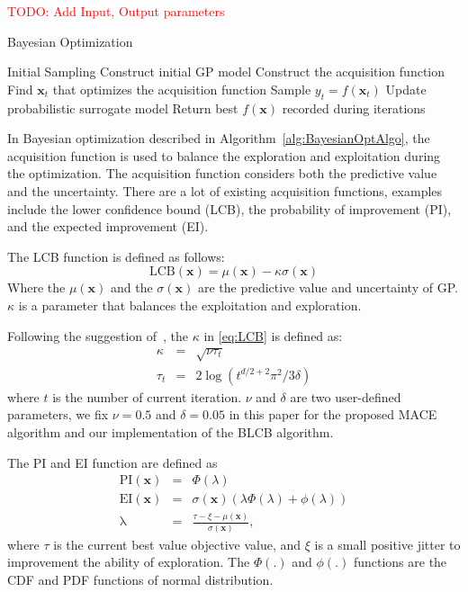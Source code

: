 \textcolor{red}{TODO: Add Input, Output parameters}
\begin{algorithm}
\caption{Bayesian Optimization}
\label{alg:BayesianOptAlgo}
\begin{algorithmic}[1]
\STATE Initial Sampling
\STATE Construct initial GP model
\STATE Construct the acquisition function
\STATE Find $\bm{x}_t$ that optimizes the acquisition function
\STATE Sample $y_t = f(\bm{x}_t)$
\STATE Update probabilistic surrogate model
\ENDFOR
\STATE Return best $f(\bm{x})$ recorded during iterations
\end{algorithmic}
\end{algorithm}

In Bayesian optimization described in Algorithm~\ref{alg:BayesianOptAlgo}, the acquisition function is used to balance the exploration and exploitation during the optimization. The acquisition function considers both the predictive value and the uncertainty. There are a lot of existing acquisition functions, examples include the lower confidence bound (LCB), the probability of improvement (PI), and the expected improvement (EI).

The LCB function is defined as follows:
\begin{equation}
    \label{eq:LCB}
    \mathrm{LCB}(\bm{x}) = \mu(\bm{x}) - \kappa \sigma(\bm{x})
\end{equation}
Where the $\mu(\bm{x})$ and the $\sigma(\bm{x})$ are the predictive value and uncertainty of GP. $\kappa$ is a parameter that balances the exploitation and exploration. 

Following the suggestion of~\cite{brochu2010tutorial}, the $\kappa$ in \eqref{eq:LCB} is defined as:
\begin{equation}
    \label{eq:LCBKappa}
    \begin{array}{lll}
        \kappa &=& \sqrt{\nu \tau_t} \\
        \tau_t &=& 2 \log(t^{d/2+2} \pi^2 / 3 \delta)
    \end{array}
\end{equation}
where $t$ is the number of current iteration. $\nu$ and $\delta$ are two user-defined parameters, we fix $\nu = 0.5$ and $\delta = 0.05$ in this paper for the proposed MACE algorithm and our implementation of the BLCB algorithm.

The PI and EI function are defined as
\begin{equation}
    \label{eq:PI_EI}
    \begin{array}{lll}
        \mathrm{PI}(\bm{x}) &=& \Phi(\lambda) \\
        \mathrm{EI}(\bm{x}) &=& \sigma(\bm{x}) (\lambda \Phi(\lambda) + \phi(\lambda))     \\
        \mathrm{\lambda}    &=& \displaystyle \frac{\tau - \xi - \mu(\bm{x})}{\sigma(\bm{x})}, 
    \end{array}
\end{equation}
where $\tau$ is the current best value objective value, and $\xi$ is a small positive jitter to improvement the ability of exploration. The $\Phi(.)$ and $\phi(.)$ functions are the CDF and PDF functions of normal distribution.

